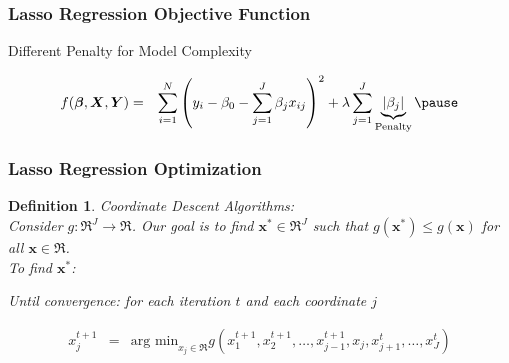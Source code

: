 \documentclass{beamer}
\newtheorem{defn}{Definition}
\numberwithin{equation}{section}
\begin{document}
\begin{frame}
\frametitle{Lasso Regression Objective Function}

Different Penalty for Model Complexity

\begin{eqnarray}
f(\boldsymbol{\beta}, \boldsymbol{X}, \boldsymbol{Y} ) & = & \sum_{i=1}^{N} \left(y_{i} - \beta_{0} - \sum_{j=1}^{J} \beta_{j} x_{ij}  \right)^{2} + \lambda \sum_{j=1}^{J} \underbrace{|\beta_{j}|}_{\text{Penalty}} \nonumber \pause
\end{eqnarray}



\end{frame}


\begin{frame}
\frametitle{Lasso Regression Optimization}

\begin{defn}
\alert{Coordinate Descent Algorithms: } \\
Consider $g:\Re^{J} \rightarrow \Re$.  Our goal is to find $\boldsymbol{x}^{*} \in \Re^{J}$ such that $g(\boldsymbol{x}^{*}) \leq g(\boldsymbol{x})$ for all $\boldsymbol{x} \in \Re$. \\

To find $\boldsymbol{x}^{*}$:


Until convergence: for each iteration $t$ and each coordinate $j$

\begin{eqnarray}
x_{j}^{t + 1} & = & \text{arg min}_{x_{j} \in \Re}g(x_{1}^{t +1}, x_{2}^{t + 1}, \hdots, x_{j-1}^{t+1}, x_{j}, x_{j+1}^{t}, \hdots, x_{J}^{t}) \nonumber
\end{eqnarray}

\end{defn}

\end{frame}
\end{document}
